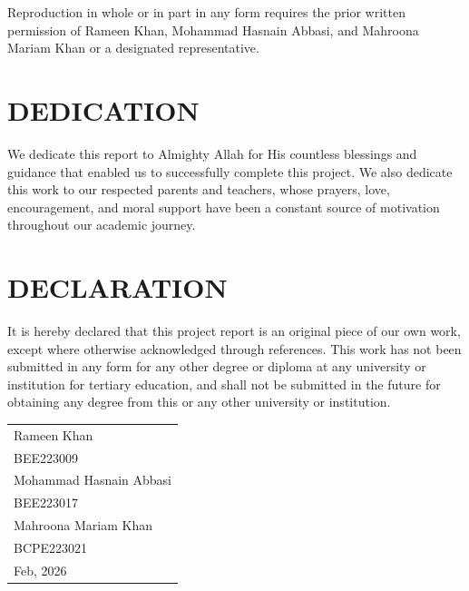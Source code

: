 \documentclass[12pt,a4paper]{report}
\begin{document}
	\vspace{1cm}
	
	\noindent
	Reproduction in whole or in part in any form requires the prior written
	permission of Rameen Khan, Mohammad Hasnain Abbasi, and Mahroona Mariam Khan
	or a designated representative.
	
	
	\newpage
	
	\chapter*{DEDICATION}
	
	We dedicate this report to Almighty Allah for His countless blessings and guidance
	that enabled us to successfully complete this project. We also dedicate this work to
	our respected parents and teachers, whose prayers, love, encouragement, and
	moral support have been a constant source of motivation throughout our academic
	journey.
	
	
	\newpage
	\chapter*{DECLARATION}
	
	It is hereby declared that this project report is an original piece of our own work, except where
	otherwise acknowledged through references. This work has not been submitted in any form for
	any other degree or diploma at any university or institution for tertiary education, and shall not be
	submitted in the future for obtaining any degree from this or any other university or institution.
	
	\vspace{1.5cm}
	
	\begin{tabular}{@{}l}
		Rameen Khan \\
		BEE223009 \\[0.8cm]
		
		Mohammad Hasnain Abbasi \\
		BEE223017 \\[0.8cm]
		
		Mahroona Mariam Khan \\
		BCPE223021 \\[0.8cm]
		
		Feb, 2026
	\end{tabular}
	
\end{document}
